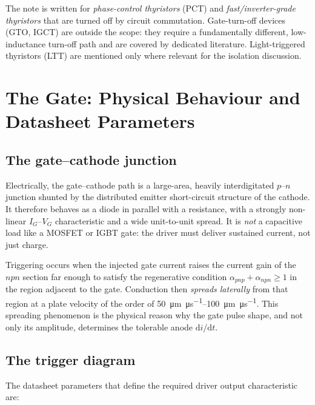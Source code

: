 The note is written for \emph{phase-control thyristors} (PCT) and
\emph{fast/inverter-grade thyristors} that are turned off by circuit commutation.
Gate-turn-off devices (GTO, IGCT) are outside the scope: they require a
fundamentally different, low-inductance turn-off path and are covered by dedicated
literature. Light-triggered thyristors (LTT) are mentioned only where relevant for
the isolation discussion.

\section{The Gate: Physical Behaviour and Datasheet Parameters}

\subsection{The gate--cathode junction}

Electrically, the gate--cathode path is a large-area, heavily interdigitated
$p$--$n$ junction shunted by the distributed emitter short-circuit structure of the
cathode. It therefore behaves as a diode in parallel with a resistance, with a
strongly non-linear $I_G$--$V_G$ characteristic and a wide unit-to-unit spread. It
is \emph{not} a capacitive load like a MOSFET or IGBT gate: the driver must deliver
sustained current, not just charge.

Triggering occurs when the injected gate current raises the current gain of the
$npn$ section far enough to satisfy the regenerative condition
$\alpha_{pnp}+\alpha_{npn}\ge 1$ in the region adjacent to the gate. Conduction
then \emph{spreads laterally} from that region at a plate velocity of the order of
\SIrange{50}{100}{\micro\metre\per\micro\second}. This spreading phenomenon is the
physical reason why the gate pulse shape, and not only its amplitude, determines
the tolerable anode $\mathrm{d}i/\mathrm{d}t$.

\subsection{The trigger diagram}

The datasheet parameters that define the required driver output characteristic are:

